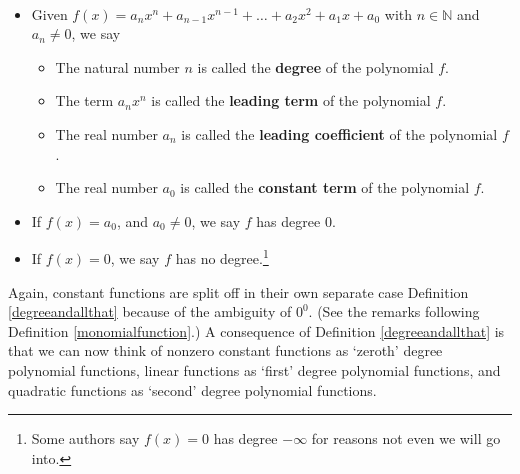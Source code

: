 \documentclass{ximera}
\begin{document}

\begin{definition}  \label{degreeandallthat} $~$

\begin{itemize}

\item Given $f(x) = a_{n} x^{n} + a_{n-1} x^{n-1} + \ldots + a_2 x^2 + a_1 x + a_0$ with $n \in \mathbb{N}$ and $a_{n} \neq 0$, we say 

\begin{itemize}

\item  The natural number $n$ is called the \textbf{degree} of the polynomial $f$.

\item  The term $a_{n} x^{n}$ is called the \textbf{leading term} of the polynomial $f$.

\item  The real number $a_{n}$ is called the \textbf{leading coefficient} of the polynomial $f$.

\item  The real number $a_0$ is called the \textbf{constant term} of the polynomial $f$.

\end{itemize}

\item  If $f(x) = a_0$, and $a_0 \neq 0$, we say $f$ has degree $0$.

\item  If $f(x) = 0$, we say $f$ has no degree.\footnote{Some authors say $f(x) = 0$ has degree $-\infty$ for reasons not even we will go into.}

\end{itemize}

\end{definition}



Again, constant functions are split off in their own separate case Definition \ref{degreeandallthat} because of the ambiguity of $0^0$. (See the remarks following Definition \ref{monomialfunction}.)   A consequence of Definition \ref{degreeandallthat} is that we can now think of nonzero constant functions as `zeroth'  degree polynomial functions, linear functions as `first' degree polynomial functions, and quadratic functions as `second' degree polynomial functions.  
\end{document}
